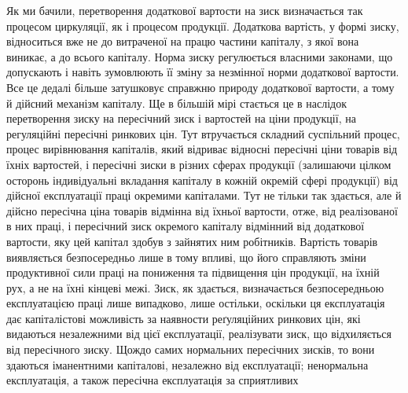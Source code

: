 Як ми бачили, перетворення додаткової вартости на зиск визначається так
процесом циркуляції, як і процесом продукції. Додаткова вартість, у формі зиску,
відноситься вже не до витраченої на працю частини капіталу, з якої вона виникає,
а до всього капіталу. Норма зиску регулюється власними законами, що
допускають і навіть зумовлюють її зміну за незмінної норми додаткової
вартости. Все це дедалі більше затушковує справжню природу додаткової вартости,
а тому й дійсний механізм капіталу. Ще в більшій мірі стається це
в наслідок перетворення зиску на пересічний зиск і вартостей на ціни продукції,
на регуляційні пересічні ринкових цін. Тут втручається складний суспільний
процес, процес вирівнювання капіталів, який відриває відносні пересічні
ціни товарів від їхніх вартостей, і пересічні зиски в різних сферах продукції
(залишаючи цілком осторонь індивідуальні вкладання капіталу в кожній окремій
сфері продукції) від дійсної експлуатації праці окремими капіталами. Тут не
тільки так здається, але й дійсно пересічна ціна товарів відмінна від їхньої
вартости, отже, від реалізованої в них праці, і пересічний зиск окремого капіталу
відмінний від додаткової вартости, яку цей капітал здобув з зайнятих ним
робітників. Вартість товарів виявляється безпосередньо лише в тому впливі, що
його справляють зміни продуктивної сили праці на пониження та підвищення цін
продукції, на їхній рух, а не на їхні кінцеві межі. Зиск, як здається, визначається
безпосередньою експлуатацією праці лише випадково, лише остільки,
оскільки ця експлуатація дає капіталістові можливість за наявности реґуляційних
ринкових цін, які видаються незалежними від цієї експлуатації, реалізувати
зиск, що відхиляється від пересічного зиску. Щождо самих нормальних пересічних
зисків, то вони здаються іманентними капіталові, незалежно від експлуатації;
ненормальна експлуатація, а також пересічна експлуатація за сприятливих
\parbreak{}  %
